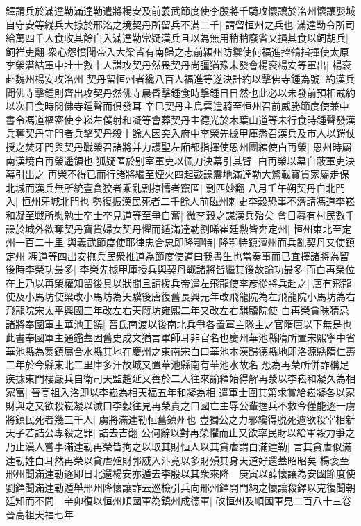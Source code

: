 鐸請兵於滿達勒滿達勒遣將楊安及前義武節度使李殷將千騎攻懷讓於洺州懷讓嬰城自守安等縱兵大掠於邢洺之境契丹所留兵不滿二千|{
	謂留恒州之兵也}
滿達勒令所司給萬四千人食收其餘自入滿達勒常疑漢兵且以為無用稍稍廢省又損其食以飼胡兵|{
	飼祥吏翻}
衆心怨憤聞帝入大梁皆有南歸之志前潁州防禦使何福進控鶴指揮使太原李榮潜結軍中壯士數十人謀攻契丹然畏契丹尚彊猶豫未發會楊衮楊安等軍出|{
	楊衮赴魏州楊安攻洺州}
契丹留恒州者纔八百人福進等遂決計約以擊佛寺鍾為號|{
	約漢兵聞佛寺擊鍾則齊出攻契丹然佛寺晨昏擊鍾食時撃鍾日日然也此必以未發前預相戒約以次日食時閒佛寺鍾聲而俱發耳}
辛巳契丹主烏雲遣騎至恒州召前威勝節度使兼中書令馮道樞密使李崧左僕射和凝等會葬契丹主德光於木葉山道等未行食時鍾聲發漢兵奪契丹守門者兵擊契丹殺十餘人因突入府中李榮先據甲庫悉召漢兵及市人以鎧仗授之焚牙門與契丹戰榮召諸將并力護聖左廂都指揮使恩州團練使白再榮|{
	恩州時屬南漢境白再榮遥領也}
狐疑匿於别室軍吏以佩刀決幕引其臂|{
	白再榮以幕自蔽軍吏決幕引出之}
再榮不得已而行諸將繼至煙火四起鼓譟震地滿達勒大驚載寶貨家屬走保北城而漢兵無所統壹貪狡者乘亂剽掠懦者竄匿|{
	剽匹妙翻}
八月壬午朔契丹自北門入|{
	恒州牙城北門也}
勢復振漢民死者二千餘人前磁州刺史李穀恐事不濟請馮道李崧和凝至戰所慰勉士卒士卒見道等至爭自奮|{
	微李穀之謀漢兵殆矣}
會日暮有村民數千譟於城外欲奪契丹寶貨婦女契丹懼而遁滿達勒劉晞崔廷勲皆奔定州|{
	恒州東北至定州一百二十里}
與義武節度使耶律忠合忠即隆卾特|{
	隆卾特鎮澶州而兵亂契丹又使鎮定州}
馮道等四出安撫兵民衆推道為節度使道曰我書生也當奏事而已宜擇諸將為留後時李榮功最多|{
	李榮先據甲庫授兵與契丹戰諸將皆繼其後故論功最多}
而白再榮位在上乃以再榮權知留後具以狀聞且請援兵帝遣左飛龍使李彦從將兵赴之|{
	唐有飛龍使及小馬坊使梁改小馬坊為天驥後唐復舊長興元年改飛龍院為左飛龍院小馬坊為右飛龍院宋太平興國三年改左右天廐坊雍熙二年又改左右騏驥院使}
白再榮貪昧猜忌諸將奉國軍主華池王饒|{
	晉氏南渡以後南北兵爭各置軍主隊主之官隋唐以下無是也此書奉國軍主通鑑蓋因舊史成文猶言軍師耳非官名也慶州華池縣隋所置宋熙寧中省華池縣為寨鎮屬合水縣其地在慶州之東南宋白曰華池本漢歸德縣地即洛源縣隋仁夀二年於今縣東北二里庫多汗故城又置華池縣南有華池水故名}
恐為再榮所併詐稱足疾據東門樓嚴兵自衛司天監趙延乂善於二人往來諭釋始得解再滎以李崧和凝久為相家富|{
	晉高祖入洛即以李崧為相天福五年和凝為相}
遣軍士圍其第求賞給崧凝各以家財與之又欲殺崧凝以滅口李穀往見再榮責之曰國亡主辱公輩握兵不救今僅能逐一虜將鎮民死者幾三千人|{
	虜將滿達勒恒舊鎮州也}
豈獨公之力邪纔得脱死遽欲殺宰相新天子若詰公專殺之罪|{
	詰去吉翻}
公何辭以對再榮懼而止又欲率民財以給軍穀力爭之乃止漢人嘗事滿達勒再榮皆拘之以取其財恒人以其貪虐謂白滿達勒|{
	言其貪虐似滿達勒姓白耳然再榮以貪虐殖財郭威入汴竟以多財殞其身天道好還蓋昭昭矣}
楊衮至邢州聞滿達勒逐即日北還楊安亦遁去李殷以其衆來降　庚寅以薛懷讓為安國節度使劉鐸聞滿達勒遁舉邢州降懷讓詐云巡檢引兵向邢州鐸開門納之懷讓殺鐸以克復聞朝廷知而不問　辛卯復以恒州順國軍為鎮州成德軍|{
	改恒州及順國軍見二百八十三卷晉高祖天福七年}
